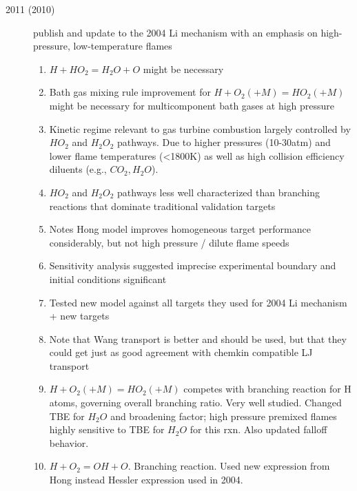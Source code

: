 \documentclass[preprint,3p,times,twocolumn]{elsarticle}
\begin{document}
\begin{description}
            \item[2011 (2010)] \citet{BurkeCJDK12} publish and update to the
                2004 Li mechanism with an emphasis on high-pressure,
                low-temperature flames
                \begin{enumerate}
                    \item $H + HO_2 = H_2O +O$ might be necessary
                    \item Bath gas mixing rule improvement for $H + O_2 (+M) =
                        HO_2 (+M)$ might be necessary for multicomponent bath
                        gases at high pressure
                    \item Kinetic regime relevant to gas turbine combustion
                        largely controlled by $HO_2$ and $H_2O_2$ pathways. Due
                        to higher pressures (10-30atm) and lower flame
                        temperatures (<1800K) as well as high collision
                        efficiency diluents (e.g., $CO_2, H_2O$). 
                    \item $HO_2$ and $H_2O_2$ pathways less well characterized
                        than branching reactions that dominate traditional
                        validation targets
                    \item Notes Hong model improves homogeneous target
                        performance considerably, but not high pressure /
                        dilute flame speeds
                    \item Sensitivity analysis suggested imprecise
                        experimental boundary and initial conditions
                        significant
                    \item Tested new model against all targets they used for 2004 Li mechanism + new targets
                    \item Note that Wang transport is better and should be
                        used, but that they could get just as good agreement
                        with chemkin compatible LJ transport
                    \item $H + O_2 (+M) = HO_2 (+M)$ competes with branching
                        reaction for H atoms, governing overall branching ratio.
                        Very well studied. Changed TBE for $H_2O$ and
                        broadening factor;  high pressure premixed flames
                        highly sensitive to TBE for $H_2O$ for this rxn. Also updated falloff behavior.
                    \item $H + O_2 = OH + O$. Branching reaction. Used new expression from Hong instead Hessler expression used in 2004.

\end{enumerate}
\end{description}
\end{document}
